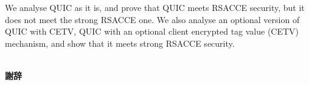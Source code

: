 \documentclass[11pt,a4j]{jarticle}
\def\thanks{~\\[.5\baselineskip]{\bf 謝辞}\hspace*{1zw}}
\begin{document}
%
We analyse QUIC as it is, and prove that QUIC meets RSACCE security, but it does not meet
the strong RSACCE one.
We also analyse an optional version of QUIC with CETV, QUIC with an optional client encrypted tag value
(CETV) mechanism, and show that it meets strong RSACCE security.

\thanks
%
\dotfill \\ \dotfill



\end{document}

